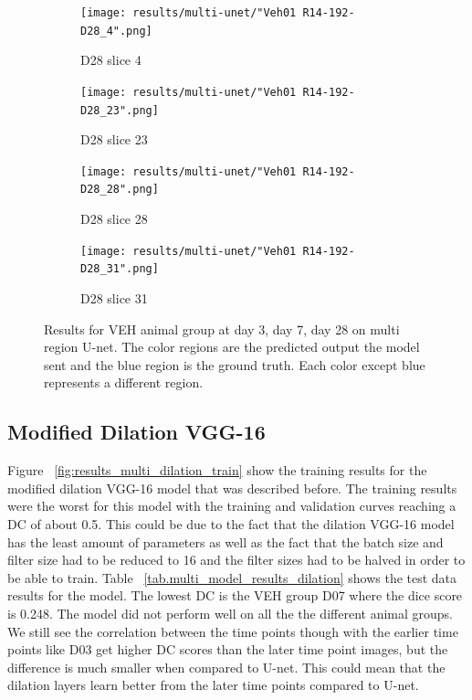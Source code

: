 \begin{figure}[!htb]
\medskip
\begin{subfigure}{0.25\textwidth}
  \texttt{[image: results/multi-unet/"Veh01 R14-192-D28\_4".png]}
  \caption{D28 slice 4}
\end{subfigure}\hfil %
\begin{subfigure}{0.25\textwidth}
  \texttt{[image: results/multi-unet/"Veh01 R14-192-D28\_23".png]}
  \caption{D28 slice 23}
\end{subfigure}\hfil %
\begin{subfigure}{0.25\textwidth}
  \texttt{[image: results/multi-unet/"Veh01 R14-192-D28\_28".png]}
  \caption{D28 slice 28}
\end{subfigure}\hfil %
\begin{subfigure}{0.25\textwidth}
  \texttt{[image: results/multi-unet/"Veh01 R14-192-D28\_31".png]}
  \caption{D28 slice 31}
\end{subfigure}
  
  \caption{Results for VEH animal group at day 3, day 7, day 28 on multi region U-net. The color regions are the predicted output the model sent and the blue region is the ground truth. Each color except blue represents a different region.}
  \label{fig:results_multi_unet_VEH}
\end{figure}


\subsection{Modified Dilation VGG-16}
    Figure ~\ref{fig:results_multi_dilation_train} show the training results for the modified dilation VGG-16 model that was described before. 
    The training results were the worst for this model with the training and validation curves reaching a DC of about 0.5.
    This could be due to the fact that the dilation VGG-16 model has the least amount of parameters as well as the fact that the batch size and filter size had to be reduced to 16 and the filter sizes had to be halved in order to be able to train. 
    Table ~\ref{tab.multi_model_results_dilation} shows the test data results for the model. The lowest DC is the VEH group D07 where the dice score is 0.248. 
    The model did not perform well on all the the different animal groups.
    We still see the correlation between the time points though with the earlier time points like D03 get higher DC scores than the later time point images, but the difference is much smaller when compared to U-net. 
    This could mean that the dilation layers learn better from the later time points compared to U-net.
    

